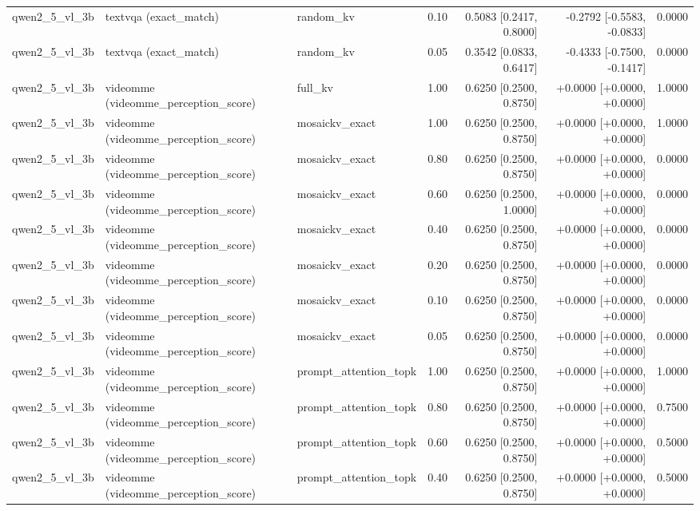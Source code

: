 \begin{longtable}{lllrrrr}
qwen2\_5\_vl\_3b & textvqa (exact\_match) & random\_kv & 0.10 & 0.5083 [0.2417, 0.8000] & -0.2792 [-0.5583, -0.0833] & 0.0000 \\
qwen2\_5\_vl\_3b & textvqa (exact\_match) & random\_kv & 0.05 & 0.3542 [0.0833, 0.6417] & -0.4333 [-0.7500, -0.1417] & 0.0000 \\
qwen2\_5\_vl\_3b & videomme (videomme\_perception\_score) & full\_kv & 1.00 & 0.6250 [0.2500, 0.8750] & +0.0000 [+0.0000, +0.0000] & 1.0000 \\
qwen2\_5\_vl\_3b & videomme (videomme\_perception\_score) & mosaickv\_exact & 1.00 & 0.6250 [0.2500, 0.8750] & +0.0000 [+0.0000, +0.0000] & 1.0000 \\
qwen2\_5\_vl\_3b & videomme (videomme\_perception\_score) & mosaickv\_exact & 0.80 & 0.6250 [0.2500, 0.8750] & +0.0000 [+0.0000, +0.0000] & 0.0000 \\
qwen2\_5\_vl\_3b & videomme (videomme\_perception\_score) & mosaickv\_exact & 0.60 & 0.6250 [0.2500, 1.0000] & +0.0000 [+0.0000, +0.0000] & 0.0000 \\
qwen2\_5\_vl\_3b & videomme (videomme\_perception\_score) & mosaickv\_exact & 0.40 & 0.6250 [0.2500, 0.8750] & +0.0000 [+0.0000, +0.0000] & 0.0000 \\
qwen2\_5\_vl\_3b & videomme (videomme\_perception\_score) & mosaickv\_exact & 0.20 & 0.6250 [0.2500, 0.8750] & +0.0000 [+0.0000, +0.0000] & 0.0000 \\
qwen2\_5\_vl\_3b & videomme (videomme\_perception\_score) & mosaickv\_exact & 0.10 & 0.6250 [0.2500, 0.8750] & +0.0000 [+0.0000, +0.0000] & 0.0000 \\
qwen2\_5\_vl\_3b & videomme (videomme\_perception\_score) & mosaickv\_exact & 0.05 & 0.6250 [0.2500, 0.8750] & +0.0000 [+0.0000, +0.0000] & 0.0000 \\
qwen2\_5\_vl\_3b & videomme (videomme\_perception\_score) & prompt\_attention\_topk & 1.00 & 0.6250 [0.2500, 0.8750] & +0.0000 [+0.0000, +0.0000] & 1.0000 \\
qwen2\_5\_vl\_3b & videomme (videomme\_perception\_score) & prompt\_attention\_topk & 0.80 & 0.6250 [0.2500, 0.8750] & +0.0000 [+0.0000, +0.0000] & 0.7500 \\
qwen2\_5\_vl\_3b & videomme (videomme\_perception\_score) & prompt\_attention\_topk & 0.60 & 0.6250 [0.2500, 0.8750] & +0.0000 [+0.0000, +0.0000] & 0.5000 \\
qwen2\_5\_vl\_3b & videomme (videomme\_perception\_score) & prompt\_attention\_topk & 0.40 & 0.6250 [0.2500, 0.8750] & +0.0000 [+0.0000, +0.0000] & 0.5000 \\

\end{longtable}
